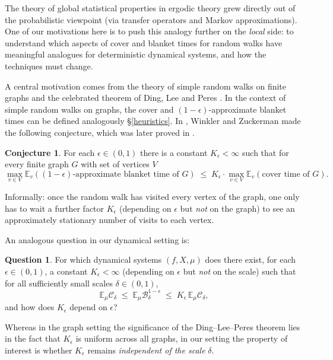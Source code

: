 \documentclass[11pt, reqno]{amsart}
\numberwithin{equation}{section}
\theoremstyle{plain}%
\theoremstyle{definition}
\newtheorem{conj}[thm]{Conjecture}
\newtheorem{ques}[thm]{Question}
\def\B{\ensuremath{\mathcal B}}
\def\C{\ensuremath{\mathcal C}}
\renewcommand{\C}{\mathcal{C}}
\theoremstyle{nonumberplain}
\begin{document}
The theory of global statistical properties in ergodic theory grew directly out of the probabilistic viewpoint (via transfer operators and Markov approximations). One of our motivations here is to push this analogy further on the \emph{local} side: to understand which aspects of cover and blanket times for random walks have meaningful analogues for deterministic dynamical systems, and how the techniques must change.

A central motivation comes from the theory of simple random walks on finite graphs and the celebrated theorem of Ding, Lee and Peres \cite{DLP}. In the context of simple random walks on graphs, the cover and $(1-\epsilon)$-approximate blanket times can be defined analogously \S\ref{heuristics}. In \cite{WinZuc96}, Winkler and Zuckerman made the following conjecture, which was later proved in \cite{DLP}.

\begin{conj}\label{wz}
For each $\epsilon\in (0,1)$ there is a constant $K_\epsilon<\infty$ such that for every finite graph $G$ with set of vertices $V$
\[
\max_{v \in V}\mathbb{E}_v((1-\epsilon)\text{-approximate blanket time of $G$})
  \;\le\; K_\epsilon \cdot 
  \max_{v \in V}\mathbb{E}_v(\text{cover time of $G$}).
\]
\end{conj}

Informally: once the random walk has visited every vertex of the graph, one only has to wait a further factor $K_\epsilon$ (depending on $\epsilon$ but \emph{not} on the graph) to see an approximately stationary number of visits to each vertex.

An analogous question in our dynamical setting is:

\begin{ques}\label{metaques}
For which dynamical systems $(f,X,\mu)$ does there exist, for each $\epsilon\in (0,1)$, a constant $K_\epsilon<\infty$ (depending on $\epsilon$ but \emph{not} on the scale) such that for all sufficiently small scales $\delta \in (0,1)$,
\[
  \mathbb{E}_\mu \C_\delta 
  \;\leq\; \mathbb{E}_\mu \B_\delta^{1-\epsilon}
  \;\leq\; K_\epsilon\,\mathbb{E}_\mu \C_\delta,
\]
and how does $K_\epsilon$ depend on $\epsilon$?
\end{ques}

Whereas in the graph setting the significance of the Ding–Lee–Peres theorem lies in the fact that $K_\epsilon$ is uniform across all graphs, in our setting the property of interest is whether $K_\epsilon$ remains \emph{independent of the scale} $\delta$.
\end{document}
